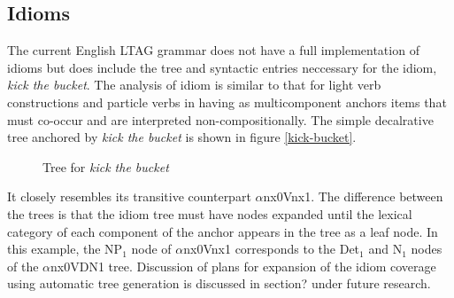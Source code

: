 


\subsection{Idioms}
The current English LTAG grammar does not have a full implementation
of idioms but does include the tree and syntactic entries neccessary
for the idiom, {\it kick the bucket}.  The analysis of idiom is
similar to that for light verb constructions and particle verbs in
having as multicomponent anchors items that must co-occur and are
interpreted non-compositionally. The simple decalrative tree anchored
by {\it kick the bucket} is shown in figure \ref{kick-bucket}.


\begin{figure}
{}
\caption{Tree for {\it kick the bucket}}
\end{figure}
It closely resembles its transitive counterpart $\alpha$nx0Vnx1.  The
difference between the trees is that the idiom tree must have nodes
expanded until the lexical category of each component of the anchor
appears in the tree as a leaf node. In this example, the NP$_{1}$ node
of $\alpha$nx0Vnx1 corresponds to the Det$_{1}$ and N$_{1}$ nodes of
the $\alpha$nx0VDN1 tree. Discussion of plans for expansion of the
idiom coverage using automatic tree generation is discussed in
section? under future research.
